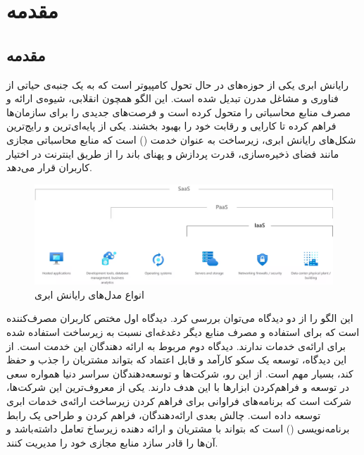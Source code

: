 \chapter{مقدمه}
\section{مقدمه}
رایانش ابری یکی از حوزه‌های در حال تحول کامپیوتر است که به یک جنبه‌ی حیاتی از فناوری و مشاغل مدرن تبدیل شده است. این الگو همچون انقلابی، شیوه‌ی ارائه و مصرف منابع محاسباتی را متحول کرده است و فرصت‌های جدیدی را برای سازمان‌ها فراهم کرده تا کارایی و رقابت خود را بهبود بخشند. یکی از پایه‌ای‌ترین و رایج‌ترین شکل‌های رایانش ابری، زیرساخت به عنوان خدمت () است که منابع محاسباتی مجازی مانند فضای ذخیره‌سازی، قدرت پردازش و پهنای باند را از طریق اینترنت در اختیار کاربران قرار می‌دهد\cite{Mell_2011}.

\begin{figure}[h]
	\vspace{1cm}
	\centering
	\includegraphics[scale=0.35]{figures/cloud_computing_models.png}
	\caption{انواع مدل‌های رایانش ابری\cite{microsoft_cc_models}}
	\label{fig:cc_models}
\end{figure}

این الگو را از دو دیدگاه می‌توان بررسی کرد. دیدگاه اول مختص کاربران مصرف‌کننده است که برای استفاده و مصرف منابع دیگر دغدغه‌ای نسبت به زیرساخت استفاده شده برای ارائه‌ی خدمات ندارند. دیدگاه دوم مربوط به ارائه دهندگان این خدمت است. از این دیدگاه، توسعه یک سکو کارآمد و قابل اعتماد که بتواند مشتریان را جذب و حفظ کند، بسیار مهم است. از این رو، شرکت‌ها و توسعه‌دهندگان سراسر دنیا همواره سعی در توسعه و فراهم‌کردن ابزارها با این هدف دارند. یکی از معروف‌ترین این شرکت‌ها، شرکت  است که برنامه‌های فراوانی برای فراهم کردن زیرساخت ارائه‌ی خدمات ابری توسعه داده است. چالش بعدی ارائه‌دهندگان، فراهم کردن و طراحی یک رابط برنامه‌نویسی () است که بتواند با مشتریان و ارائه دهنده زیرساخ تعامل داشته‌باشد و آن‌ها را قادر سازد منابع مجازی خود را مدیریت کنند.
